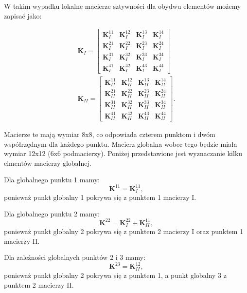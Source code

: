 W takim wypadku lokalne macierze sztywności dla obydwu elementów możemy zapisać jako:

\begin{gather}
	\textbf{K}_{I} = \begin{bmatrix} 
	 	\textbf{K}^{11}_I & \textbf{K}^{12}_I & \textbf{K}^{13}_I & \textbf{K}^{14}_I \\
	 	\textbf{K}^{21}_I & \textbf{K}^{22}_I & \textbf{K}^{23}_I & \textbf{K}^{24}_I \\
	 	\textbf{K}^{31}_I & \textbf{K}^{32}_I & \textbf{K}^{33}_I & \textbf{K}^{34}_I \\
	 	\textbf{K}^{41}_I & \textbf{K}^{42}_I & \textbf{K}^{43}_I & \textbf{K}^{44}_I
	\end{bmatrix} \\
	\textbf{K}_{II} = \begin{bmatrix} 
	 	\textbf{K}^{11}_{II} & \textbf{K}^{12}_{II} & \textbf{K}^{13}_{II} & \textbf{K}^{14}_{II} \\
	 	\textbf{K}^{21}_{II} & \textbf{K}^{22}_{II} & \textbf{K}^{23}_{II} & \textbf{K}^{24}_{II} \\
	 	\textbf{K}^{31}_{II} & \textbf{K}^{32}_{II} & \textbf{K}^{33}_{II} & \textbf{K}^{34}_{II} \\
	 	\textbf{K}^{41}_{II} & \textbf{K}^{42}_{II} & \textbf{K}^{43}_{II} & \textbf{K}^{44}_{II}
	\end{bmatrix}.
\end{gather}

Macierze te mają wymiar 8x8, co odpowiada czterem punktom i dwóm współrzędnym dla każdego punktu. Macierz globalna wobec tego będzie miała wymiar 12x12 (6x6 podmacierzy). Poniżej przedstawione jest wyznaczanie kilku elmentów macierzy globalnej.

Dla globalnego punktu 1 mamy:
\begin{equation}
	\textbf{K}^{11} = \textbf{K}_I^{11},
\end{equation}
ponieważ punkt globalny 1 pokrywa się z punktem 1 macierzy I.

Dla globalnego punktu 2 mamy:
\begin{equation}
	\textbf{K}^{22} = \textbf{K}_I^{22} + \textbf{K}_{II}^{11},
\end{equation}
ponieważ punkt globalny 2 pokrywa się z punktem 2 macierzy I oraz punktem 1 macierzy II.

Dla zależności globalnych punktów 2 i 3 mamy:
\begin{equation}
	\textbf{K}^{23} = \textbf{K}_{II}^{12},
\end{equation}
ponieważ punkt globalny 2 pokrywa się z punktem 1, a punkt globalny 3 z punktem 2 macierzy II.


